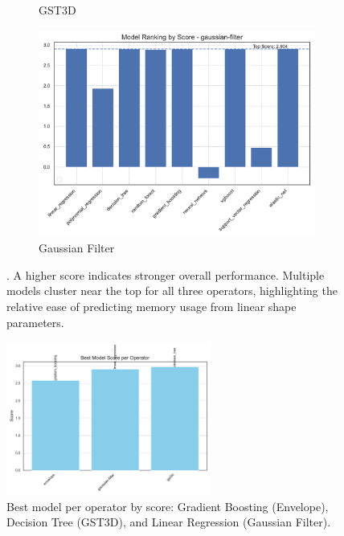 \begin{figure}[htbp]
\begin{subfigure}[t]{0.32\textwidth}
        \caption{\ac{GST3D}}
    \end{subfigure}
    \hfill
    \begin{subfigure}[t]{0.32\textwidth}
        \includegraphics[width=\textwidth]{assets/images/05/score_by_model_gaussian-filter}
        \caption{Gaussian Filter}
    \end{subfigure}
    \caption{.
        A higher score indicates stronger overall performance.
        Multiple models cluster near the top for all three operators, highlighting the relative ease of predicting memory usage from linear shape parameters.
        \label{fig:score_by_model_operators}
    }
\end{figure}

\begin{figure}[htbp]
    \centering
    \includegraphics[width=0.6\textwidth]{assets/images/05/best_model_per_operator}
    \caption{Best model per operator by score: Gradient Boosting (Envelope), Decision Tree (\ac{GST3D}), and Linear Regression (Gaussian Filter).
        \label{fig:best_model_per_operator}
    }
\end{figure}

